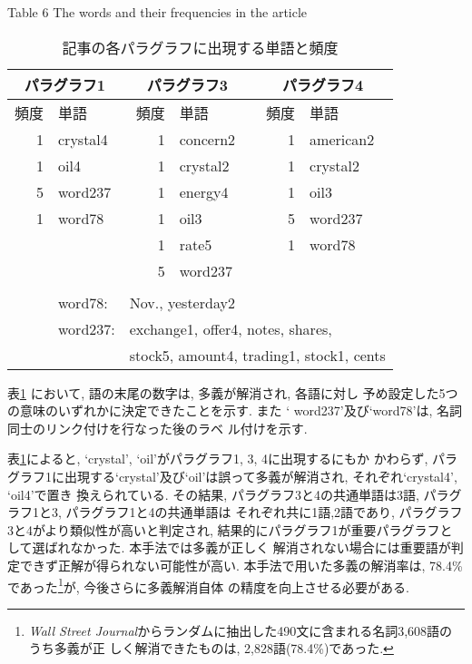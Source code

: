 \begin{enumerate}
{\footnotesize
\begin{table}[htbp]
\begin{center}
\caption{記事の各パラグラフに出現する単語と頻度} \label{bbk5_1}
\vspace*{-3mm}
Table 6 The words and their frequencies in the article \\
\begin{tabular}{rl|rl|rl} \hline \hline
\multicolumn{2}{c|}{パラグラフ1} &\multicolumn{2}{c|}{パラグラフ3} &\multicolumn{2}{c}{パラグラフ4} \\ \hline
頻度 &単語 &頻度 &単語 &頻度 &単語  \\ \hline
1 &crystal4 &1 &concern2 &1 &american2 \\
1 &oil4 &1 &crystal2 &1 &crystal2 \\
5 &{\sf word237} &1&energy4 &1 &oil3 \\
1 &{\sf word78}  &1 &oil3 &5 &{\sf word237} \\
 & &1 &rate5 &1 &{\sf word78} \\
 & &5 &{\sf word237} & & \\ \hline
\multicolumn{6}{c}{} \\
&\multicolumn{1}{l}{\sf word78:} &\multicolumn{4}{l}{Nov., yesterday2} \\
&\multicolumn{1}{l}{\sf word237:} &\multicolumn{4}{l}{exchange1, offer4, notes, shares,} \\
&\multicolumn{1}{l}{} &\multicolumn{4}{l}{stock5, amount4, trading1, stock1, cents} \\
\end{tabular}
\end{center}
\end{table}
}

\noindent
表\ref{bbk5_1} において, 語の末尾の数字は, 多義が解消され, 各語に対し
予め設定した5つの意味のいずれかに決定できたことを示す.  また `{\sf
word237}'及び`{\sf word78}'は, 名詞同士のリンク付けを行なった後のラベ
ル付けを示す.  

表\ref{bbk5_1}によると, `crystal', `oil'がパラグラフ1, 3, 4に出現するにもか
かわらず, パラグラフ1に出現する`crystal'及び`oil'は誤って多義が解消され, それぞれ`crystal4', `oil4'で置き
換えられている.  その結果, パラグラフ3と4の共通単語は3語, パラグラフ1と3, パラグラフ1と4の共通単語は
それぞれ共に1語,2語であり, パラグラフ3と4がより類似性が高いと判定され, 
結果的にパラグラフ1が重要パラグラフとして選ばれなかった.  本手法では多義が正しく
解消されない場合には重要語が判定できず正解が得られない可能性が高い.
本手法で用いた多義の解消率は, 78.4\%であった\footnote{{\it Wall Street
Journal}からランダムに抽出した490文に含まれる名詞3,608語のうち多義が正
しく解消できたものは, 2,828語(78.4\%)であった.}が, 今後さらに多義解消自体
の精度を向上させる必要がある.

\end{enumerate}


